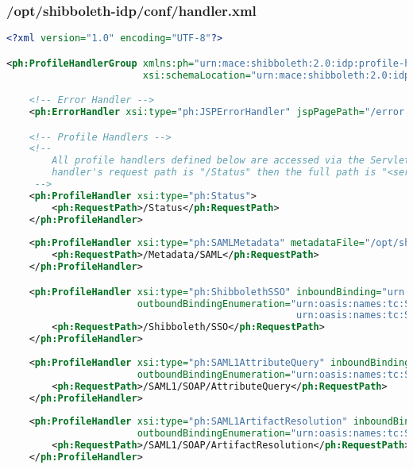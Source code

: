 \subsubsection{/opt/shibboleth-idp/conf/handler.xml}
\begin{lstlisting}[language=xml]
<?xml version="1.0" encoding="UTF-8"?>

<ph:ProfileHandlerGroup xmlns:ph="urn:mace:shibboleth:2.0:idp:profile-handler" xmlns:xsi="http://www.w3.org/2001/XMLSchema-instance" 
                        xsi:schemaLocation="urn:mace:shibboleth:2.0:idp:profile-handler classpath:/schema/shibboleth-2.0-idp-profile-handler.xsd">

    <!-- Error Handler -->
    <ph:ErrorHandler xsi:type="ph:JSPErrorHandler" jspPagePath="/error.jsp"/>

    <!-- Profile Handlers -->
    <!-- 
        All profile handlers defined below are accessed via the Servlet path "/profile" so if your profile 
        handler's request path is "/Status" then the full path is "<servletContextName>/profile/Status"
     -->
    <ph:ProfileHandler xsi:type="ph:Status">
        <ph:RequestPath>/Status</ph:RequestPath>
    </ph:ProfileHandler>
    
    <ph:ProfileHandler xsi:type="ph:SAMLMetadata" metadataFile="/opt/shibboleth-idp/metadata/idp-metadata.xml">
        <ph:RequestPath>/Metadata/SAML</ph:RequestPath>
    </ph:ProfileHandler>    

    <ph:ProfileHandler xsi:type="ph:ShibbolethSSO" inboundBinding="urn:mace:shibboleth:1.0:profiles:AuthnRequest" 
                       outboundBindingEnumeration="urn:oasis:names:tc:SAML:1.0:profiles:browser-post
                                                   urn:oasis:names:tc:SAML:1.0:profiles:artifact-01">
        <ph:RequestPath>/Shibboleth/SSO</ph:RequestPath>
    </ph:ProfileHandler>
    
    <ph:ProfileHandler xsi:type="ph:SAML1AttributeQuery" inboundBinding="urn:oasis:names:tc:SAML:1.0:bindings:SOAP-binding"
                       outboundBindingEnumeration="urn:oasis:names:tc:SAML:1.0:bindings:SOAP-binding">
        <ph:RequestPath>/SAML1/SOAP/AttributeQuery</ph:RequestPath>
    </ph:ProfileHandler>
    
    <ph:ProfileHandler xsi:type="ph:SAML1ArtifactResolution" inboundBinding="urn:oasis:names:tc:SAML:1.0:bindings:SOAP-binding" 
                       outboundBindingEnumeration="urn:oasis:names:tc:SAML:1.0:bindings:SOAP-binding">
        <ph:RequestPath>/SAML1/SOAP/ArtifactResolution</ph:RequestPath>
    </ph:ProfileHandler>
    

\end{lstlisting}
